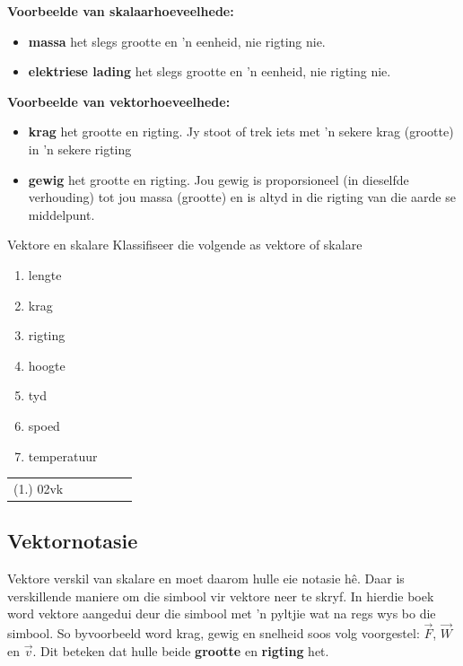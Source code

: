 \textbf{Voorbeelde van skalaarhoeveelhede:}
\begin{itemize}
\item \textbf{massa} het slegs grootte en 'n eenheid, nie rigting nie.
\item \textbf{elektriese lading} het slegs grootte en 'n eenheid, nie rigting nie.
\end{itemize}

\textbf{Voorbeelde van vektorhoeveelhede:} 
\begin{itemize}
\item \textbf{krag} het grootte en rigting. Jy stoot of trek iets met  'n sekere krag (grootte) in  'n sekere rigting
\item \textbf{gewig} het grootte en rigting. Jou gewig is proporsioneel (in dieselfde verhouding) tot jou massa (grootte) en is altyd in die rigting van die aarde se middelpunt.
\end{itemize}

\begin{exercises}{Vektore en skalare}
Klassifiseer die volgende as vektore of skalare
 \begin{enumerate}[noitemsep,label=\textbf{\arabic*}.]
\item lengte
\item krag
\item rigting
\item hoogte
\item tyd
\item spoed
\item temperatuur
 \end{enumerate}
\par \practiceinfo
 \par \begin{tabular}[h]{cccccc}
 (1.) 02vk   \end{tabular}
\end{exercises}

    \label{m38812*cid4}
      \label{m38812*uid1}
\subsection*{Vektornotasie}
            \nopagebreak
Vektore verskil van skalare en moet daarom hulle eie notasie hê. Daar is verskillende maniere om die simbool vir vektore neer te skryf. In hierdie boek word vektore aangedui deur die simbool met  'n pyltjie wat na regs wys bo die simbool. So byvoorbeeld word krag, gewig en snelheid soos volg voorgestel: $\stackrel{\to }{F}$, $\stackrel{\to }{W}$ en $\stackrel{\to }{v}$. Dit beteken dat hulle beide \textbf{grootte} en \textbf{rigting} het.

